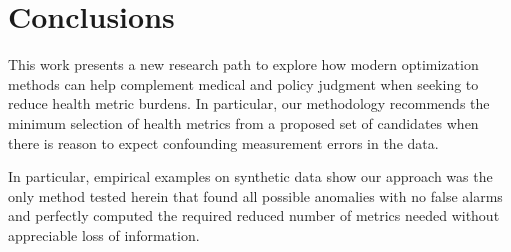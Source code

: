 \documentclass[conference]{IEEEtran}
\begin{document}



\section{Conclusions}

This work presents a new research path to explore how modern optimization methods can help complement medical and policy judgment when seeking to reduce health metric burdens.  In particular, our methodology recommends  the minimum selection of health metrics from a proposed set of candidates when there is reason to expect confounding measurement errors in the data.

In particular, empirical examples on synthetic data show our approach was the only method tested herein that found all possible anomalies with no false alarms and perfectly computed the required reduced number of metrics needed without appreciable loss of information. 


\end{document}
